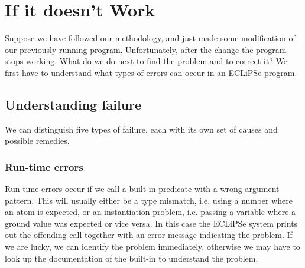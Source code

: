 \documentclass[a4paper,12pt]{report}
\begin{document}


\chapter{If it doesn't Work}
\label{ifitdoesntwork}

Suppose we have followed our methodology, and just made some modification of our previously running program. Unfortunately, after the change the program stops working. What do we do next to find the problem and to correct it? We first have to understand what types of errors can occur in an ECLiPSe program.

\section{Understanding failure}
We can distinguish five types of failure, each with its own set of causes and possible remedies.

\subsection{Run-time errors} 
Run-time errors occur if we call a built-in predicate with a wrong argument pattern. This will usually either be a type mismatch, i.e. using a number where an atom is expected, or an instantiation problem, i.e. passing a variable where a ground value was expected or vice versa. In this case the ECLiPSe system prints out the offending call together with an error message indicating the problem. If we are lucky, we can identify the problem immediately, otherwise we may have to look up the documentation of the built-in to understand the problem.
\end{document}
